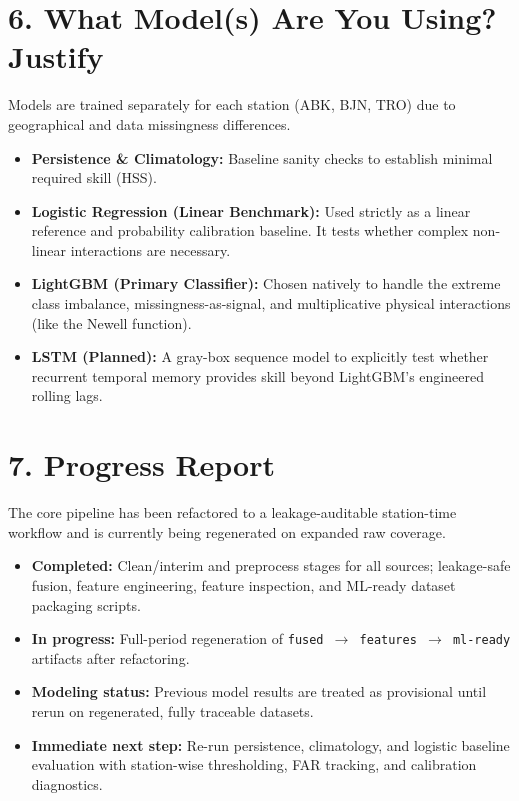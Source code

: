 \documentclass{article}
\begin{document}
\section*{6. What Model(s) Are You Using? Justify}
Models are trained separately for each station (ABK, BJN, TRO) due to geographical and data missingness differences. 
\begin{itemize}[noitemsep]
    \item \textbf{Persistence \& Climatology:} Baseline sanity checks to establish minimal required skill (HSS).
    \item \textbf{Logistic Regression (Linear Benchmark):} Used strictly as a linear reference and probability calibration baseline. It tests whether complex non-linear interactions are necessary.
    \item \textbf{LightGBM (Primary Classifier):} Chosen natively to handle the extreme class imbalance, missingness-as-signal, and multiplicative physical interactions (like the Newell function).
    \item \textbf{LSTM (Planned):} A gray-box sequence model to explicitly test whether recurrent temporal memory provides skill beyond LightGBM's engineered rolling lags.
\end{itemize}

\section*{7. Progress Report}
The core pipeline has been refactored to a leakage-auditable station-time workflow and is currently being regenerated on expanded raw coverage.
\begin{itemize}
    \item \textbf{Completed:} Clean/interim and preprocess stages for all sources; leakage-safe fusion, feature engineering, feature inspection, and ML-ready dataset packaging scripts.
    \item \textbf{In progress:} Full-period regeneration of \texttt{fused $\rightarrow$ features $\rightarrow$ ml-ready} artifacts after refactoring.
    \item \textbf{Modeling status:} Previous model results are treated as provisional until rerun on regenerated, fully traceable datasets.
    \item \textbf{Immediate next step:} Re-run persistence, climatology, and logistic baseline evaluation with station-wise thresholding, FAR tracking, and calibration diagnostics.
\end{itemize}
\end{document}

